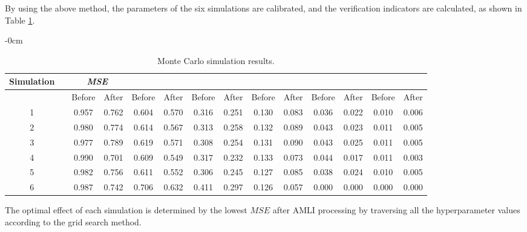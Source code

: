 \documentclass[mathematics,article,accept,pdftex,moreauthors]{Definitions/mdpi}
\begin{document}
By using the above method, the parameters of the six simulations are calibrated, and the verification indicators are calculated, as shown in Table \ref{tab1}.

\begin{table}[H]


\caption{Monte Carlo simulation results.}
\label{tab1}
\begin{adjustwidth}{-\extralength}{0cm}%


\centering
{\renewcommand{\tabcolsep}{2.5mm}
			\small\begin{tabular}{cccccccccccccc}
				\toprule
				 \textbf{Simulation} & &\multicolumn{2}{c}{\emph{\textbf{MSE}}}& \multicolumn{2}{c}{\boldmath{$p_{(0.5)}$}} &   \multicolumn{2}{c}{\boldmath{$p_{(1)}$}} & \multicolumn{2}{c}{\boldmath{$p_{(1.5)}$}} & \multicolumn{2}{c}{\boldmath{$p_{(2)}$}} & \multicolumn{2}{c}{\boldmath{$p_{(2.5)}$}}   \\
	\midrule
				& & Before & After & Before & After & Before & After & Before &  After & Before & After &Before& After \\
				1  & & 0.957 & 0.762 & 0.604 & 0.570 & 0.316 & 0.251 &0.130 & 0.083 &0.036 & 0.022 & 0.010 & 0.006 \\
				2  & & 0.980 & 0.774 & 0.614 & 0.567 & 0.313 & 0.258 &0.132 & 0.089 &0.043 & 0.023 & 0.011 & 0.005 
				\\
				3 & & 0.977 & 0.789 & 0.619 & 0.571 & 0.308 & 0.254 &0.131 & 0.090 &0.043 & 0.025 & 0.011 & 0.005 \\
				4 & & 0.990 & 0.701 & 0.609 & 0.549 & 0.317 & 0.232 &0.133 & 0.073 &0.044 & 0.017 & 0.011 & 0.003 \\
				5 & & 0.982 & 0.756 & 0.611 & 0.552 & 0.306 & 0.245 &0.127 & 0.085 &0.038 & 0.024 & 0.010 & 0.005 \\
				6 & & 0.987 & 0.742 & 0.706 & 0.632 & 0.411 & 0.297 &0.126 & 0.057 &0.000 & 0.000 & 0.000 & 0.000 \\
				\bottomrule
		\end{tabular}}
		\end{adjustwidth}
	\end{table}
\vspace{-12pt}


	\begin{Remark}
{The} 
optimal effect of each simulation is determined by the lowest $MSE$ after AMLI processing by traversing all the hyperparameter values according to the grid search method.
	\end{Remark}
\end{document}
